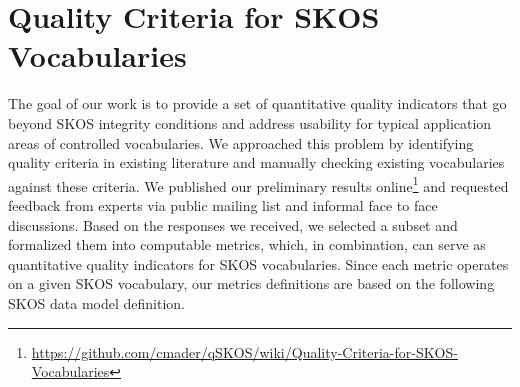 
\section{Quality Criteria for SKOS Vocabularies}\label{sec:criteria}


The goal of our work is to provide a set of quantitative quality indicators that go beyond SKOS integrity conditions and address usability for typical application areas of controlled vocabularies. We approached this problem by identifying quality criteria in existing literature and manually checking existing vocabularies against these criteria. We published our preliminary results online\footnote{\url{https://github.com/cmader/qSKOS/wiki/Quality-Criteria-for-SKOS-Vocabularies}} and requested feedback from experts via public mailing list and informal face to face discussions. Based on the responses we received, we selected a subset  and formalized them into computable metrics, which, in combination, can serve as quantitative quality indicators for SKOS vocabularies. Since each metric operates on a given SKOS vocabulary, our metrics definitions are based on the following SKOS data model definition.


